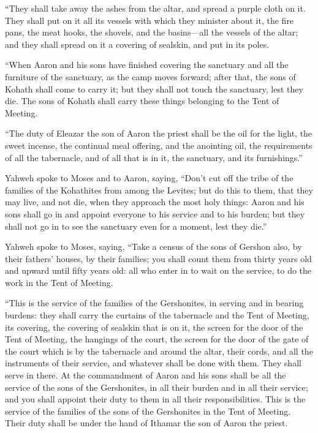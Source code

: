  ``They shall take away the ashes from the altar, and
spread a purple cloth on it.  They shall put on it all its
vessels with which they minister about it, the fire pans, the meat
hooks, the shovels, and the basins---all the vessels of the altar; and
they shall spread on it a covering of sealskin, and put in its poles.

 ``When Aaron and his sons have finished covering the
sanctuary and all the furniture of the sanctuary, as the camp moves
forward; after that, the sons of Kohath shall come to carry it; but they
shall not touch the sanctuary, lest they die. The sons of Kohath shall
carry these things belonging to the Tent of Meeting.

 ``The duty of Eleazar the son of Aaron the priest shall be
the oil for the light, the sweet incense, the continual meal offering,
and the anointing oil, the requirements of all the tabernacle, and of
all that is in it, the sanctuary, and its furnishings.''

 Yahweh spoke to Moses and to Aaron, saying, 
``Don't cut off the tribe of the families of the Kohathites from among
the Levites;  but do this to them, that they may live, and
not die, when they approach the most holy things: Aaron and his sons
shall go in and appoint everyone to his service and to his burden;
 but they shall not go in to see the sanctuary even for a
moment, lest they die.''

 Yahweh spoke to Moses, saying,  ``Take a
census of the sons of Gershon also, by their fathers' houses, by their
families;  you shall count them from thirty years old and
upward until fifty years old: all who enter in to wait on the service,
to do the work in the Tent of Meeting.

 ``This is the service of the families of the Gershonites,
in serving and in bearing burdens:  they shall carry the
curtains of the tabernacle and the Tent of Meeting, its covering, the
covering of sealskin that is on it, the screen for the door of the Tent
of Meeting,  the hangings of the court, the screen for the
door of the gate of the court which is by the tabernacle and around the
altar, their cords, and all the instruments of their service, and
whatever shall be done with them. They shall serve in there.
 At the commandment of Aaron and his sons shall be all the
service of the sons of the Gershonites, in all their burden and in all
their service; and you shall appoint their duty to them in all their
responsibilities.  This is the service of the families of
the sons of the Gershonites in the Tent of Meeting. Their duty shall be
under the hand of Ithamar the son of Aaron the priest.

